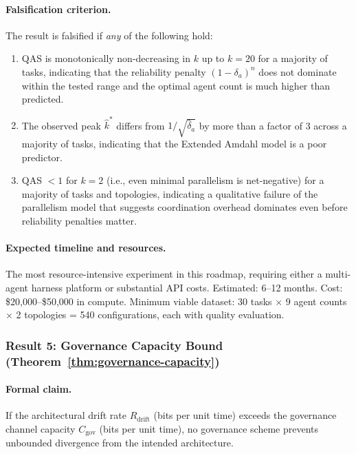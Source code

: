 \paragraph{Falsification criterion.} The result is falsified if \emph{any} of the following hold:
\begin{enumerate}[nosep]
    \item QAS is monotonically non-decreasing in $k$ up to $k = 20$ for a majority of tasks, indicating that the reliability penalty $(1-\delta_a)^n$ does not dominate within the tested range and the optimal agent count is much higher than predicted.
    \item The observed peak $\hat{k}^*$ differs from $1/\sqrt{\hat{\delta}_a}$ by more than a factor of 3 across a majority of tasks, indicating that the Extended Amdahl model is a poor predictor.
    \item QAS $< 1$ for $k = 2$ (i.e., even minimal parallelism is net-negative) for a majority of tasks and topologies, indicating a qualitative failure of the parallelism model that suggests coordination overhead dominates even before reliability penalties matter.
\end{enumerate}

\paragraph{Expected timeline and resources.} The most resource-intensive experiment in this roadmap, requiring either a multi-agent harness platform or substantial API costs. Estimated: 6--12 months. Cost: \$20,000--\$50,000 in compute. Minimum viable dataset: 30 tasks $\times$ 9 agent counts $\times$ 2 topologies = 540 configurations, each with quality evaluation.

\subsubsection{Result 5: Governance Capacity Bound (Theorem~\ref{thm:governance-capacity})}

\paragraph{Formal claim.} If the architectural drift rate $R_{\text{drift}}$ (bits per unit time) exceeds the governance channel capacity $C_{\text{gov}}$ (bits per unit time), no governance scheme prevents unbounded divergence from the intended architecture.

